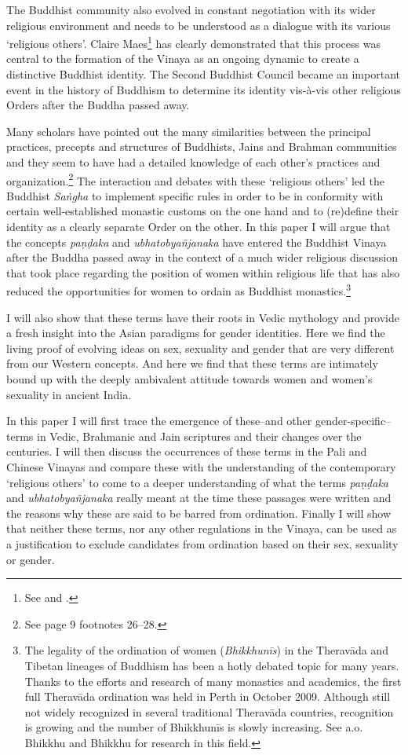 The Buddhist community also evolved in constant negotiation with its wider religious environment and needs to be understood as a dialogue with its various `religious others'. Claire Maes\footnote{See \cite{maes} and \cite{maes2016}.} has clearly demonstrated that this process was central to the formation of the Vinaya as an ongoing dynamic to create a distinctive Buddhist identity. The Second Buddhist Council became an important event in the history of Buddhism to determine its identity vis-à-vis other religious Orders after the Buddha passed away.

Many scholars have pointed out the many similarities between the principal practices, precepts and structures of Buddhists, Jains and Brahman communities and they seem to have had a detailed knowledge of each other's practices and organization.\footnote{See \cite{maes2016} page 9 footnotes 26–28.} The interaction and debates with these `religious others' led the Buddhist {\em Saṅgha} to implement specific rules in order to be in conformity with certain well-established monastic customs on the one hand and to (re)define their identity as a clearly separate Order on the other. In this paper I will argue that the concepts {\em paṇḍaka} and {\em ubhatob­yañ­janaka} have entered the Buddhist Vinaya after the Buddha passed away in the context of a much wider religious discussion that took place regarding the position of women within religious life that has also reduced the opportunities for women to ordain as Buddhist monastics.\footnote{The legality of the ordination of women ({\em Bhikkhunīs}) in the Theravāda and Tibetan lineages of Buddhism has been a hotly debated topic for many years. Thanks to the efforts and research of many monastics and academics, the first full Theravāda ordination was held in Perth in October 2009. Although still not widely recognized in several traditional Theravāda countries, recognition is growing and the number of Bhikkhunīs is slowly increasing. See a.o. Bhikkhu \cite{sujato2009} and Bhikkhu \cite{analayo2013} for research in this field.} 

I will also show that these terms have their roots in Vedic mythology and provide a fresh insight into the Asian paradigms for gender identities. Here we find the living proof of evolving ideas on sex, sexuality and gender that are very different from our Western concepts. And here we find that these terms are intimately bound up with the deeply ambivalent attitude towards women and women's sexuality in ancient India.

In this paper I will first trace the emergence of these--and other gender-specific--terms in Vedic, Brahmanic and Jain scriptures and their changes over the centuries. I will then discuss the occurrences of these terms in the Pali and Chinese Vinayas and compare these with the understanding of the contemporary `religious others' to come to a deeper understanding of what the terms {\em paṇḍaka} and {\em ubhatob­yañ­janaka} really meant at the time these passages were written and the reasons why these are said to be barred from ordination. Finally I will show that neither these terms, nor any other regulations in the Vinaya, can be used as a justification to exclude candidates from ordination based on their sex, sexuality or gender.